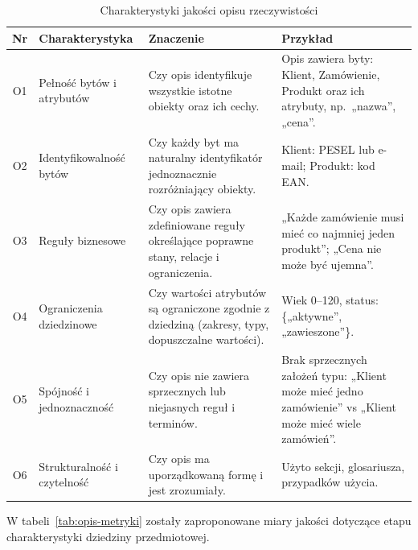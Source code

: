 \begin{table}[!ht]
  \centering
  \caption{Charakterystyki jakości opisu rzeczywistości}
  \label{tab:opis-char}
  \scriptsize
  \begin{tabularx}{\textwidth}{cLLp{5cm}}
    \toprule
    \textbf{Nr} & \textbf{Charakterystyka} & \textbf{Znaczenie} & \textbf{Przykład} \\
    \midrule
    O1 &
    Pełność bytów i atrybutów &
    Czy opis identyfikuje wszystkie istotne obiekty oraz ich cechy. &
    Opis zawiera byty: Klient, Zamówienie, Produkt oraz ich atrybuty, np.\ „nazwa”, „cena”. \\
    O2 &
    Identyfikowalność bytów &
    Czy każdy byt ma naturalny identyfikatór jednoznacznie rozróżniający obiekty. &
    Klient: PESEL lub e-mail; Produkt: kod EAN. \\
    O3 &
    Reguły biznesowe &
    Czy opis zawiera zdefiniowane reguły określające poprawne stany, relacje i ograniczenia. &
    „Każde zamówienie musi mieć co najmniej jeden produkt”; „Cena nie może być ujemna”. \\
    O4 &
    Ograniczenia dziedzinowe &
    Czy wartości atrybutów są ograniczone zgodnie z dziedziną (zakresy, typy, dopuszczalne wartości). &
    Wiek 0--120, status: \{„aktywne”, „zawieszone”\}. \\
    O5 &
    Spójność i jednoznaczność &
    Czy opis nie zawiera sprzecznych lub niejasnych reguł i terminów. &
    Brak sprzecznych założeń typu: „Klient może mieć jedno zamówienie” vs „Klient może mieć wiele zamówień”. \\
    O6 &
    Strukturalność i czytelność &
    Czy opis ma uporządkowaną formę i jest zrozumiały. &
    Użyto sekcji, glosariusza, przypadków użycia. \\
    \bottomrule
  \end{tabularx}
\end{table}





W tabeli~\ref{tab:opis-metryki} zostały zaproponowane miary jakości dotyczące etapu charakterystyki dziedziny przedmiotowej.

